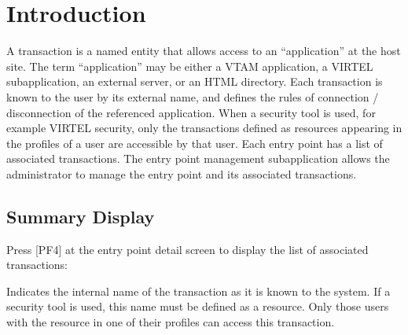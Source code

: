 \documentclass[letterpaper,10pt,english]{sphinxmanual}
\begin{document}
\section{Introduction}
\label{\detokenize{connectivity_guide:id63}}
\sphinxAtStartPar
A transaction is a named entity that allows access to an “application” at the host site. The term “application” may be either a VTAM application, a VIRTEL sub\sphinxhyphen{}application, an external server, or an HTML directory. Each transaction is known to the user by its external name, and defines the rules of connection / disconnection of the referenced application. When a security tool is used, for example VIRTEL security, only the transactions defined as resources appearing in the profiles of a user are accessible by that user. Each entry point has a list of associated transactions. The entry point management sub\sphinxhyphen{}application allows the administrator to manage the entry point and its associated transactions.

\ignorespaces 

\subsection{Summary Display}
\label{\detokenize{connectivity_guide:index-116}}\label{\detokenize{connectivity_guide:id64}}
\sphinxAtStartPar
Press {[}PF4{]} at the entry point detail screen to display the list of associated transactions:

\sphinxAtStartPar
{}

\sphinxAtStartPar
{}
\begin{description}
\sphinxAtStartPar
Indicates the internal name of the transaction as it is known to the system. If a security tool is used, this name must be defined as a resource. Only those users with the resource in one of their profiles can access this transaction.

\end{description}
\end{document}
